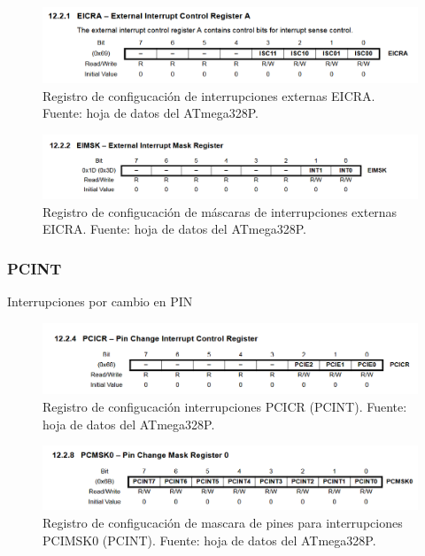     \begin{figure}[H]
    \centering
    \includegraphics[width=\linewidth]{./Anexos/Marco Teorico/External Interrupts/EICRA.png}
    \caption{Registro de configucación de interrupciones externas EICRA. Fuente: hoja de datos del ATmega328P\@\cite{atmega328p_datasheet}.}
    \label{fig:EICRA}
    \end{figure}

    \begin{figure}[H]
    \centering
    \includegraphics[width=\linewidth]{./Anexos/Marco Teorico/External Interrupts/EIMSK.png}
    \caption{Registro de configucación de máscaras de interrupciones externas EICRA. Fuente: hoja de datos del ATmega328P\@\cite{atmega328p_datasheet}.}
    \label{fig:EIMSK}
    \end{figure}

    \subsubsection{PCINT}
    Interrupciones por cambio en PIN


    \begin{figure}[H]
    \centering
    \includegraphics[width=\linewidth]{./Anexos/Marco Teorico/External Interrupts/PCICR.png}
    \caption{Registro de configucación interrupciones PCICR (PCINT). Fuente: hoja de datos del ATmega328P\@\cite{atmega328p_datasheet}.}
    \label{fig:PCICR}
    \end{figure}

    \begin{figure}[H]
    \centering
    \includegraphics[width=\linewidth]{./Anexos/Marco Teorico/External Interrupts/PCMSK.png}
    \caption{Registro de configucación de mascara de pines para interrupciones PCIMSK0 (PCINT). Fuente: hoja de datos del ATmega328P\@\cite{atmega328p_datasheet}.}
    \label{fig:PCIMSK}
    \end{figure}



